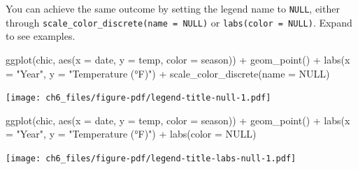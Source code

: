 \documentclass[
  letterpaper,
]{scrbook}
\newenvironment{Shaded}{\begin{snugshade}}{\end{snugshade}}
\newcommand{\AttributeTok}[1]{\textcolor[rgb]{0.40,0.45,0.13}{#1}}
\newcommand{\ConstantTok}[1]{\textcolor[rgb]{0.56,0.35,0.01}{#1}}
\newcommand{\FunctionTok}[1]{\textcolor[rgb]{0.28,0.35,0.67}{#1}}
\newcommand{\NormalTok}[1]{\textcolor[rgb]{0.00,0.23,0.31}{#1}}
\newcommand{\SpecialCharTok}[1]{\textcolor[rgb]{0.37,0.37,0.37}{#1}}
\newcommand{\StringTok}[1]{\textcolor[rgb]{0.13,0.47,0.30}{#1}}
\begin{document}
\begin{tcolorbox}[enhanced jigsaw, rightrule=.15mm, arc=.35mm, title=\textcolor{quarto-callout-tip-color}{\faLightbulb}\hspace{0.5em}{Other Ways to remove Legend Titles}, colback=white, toptitle=1mm, colbacktitle=quarto-callout-tip-color!10!white, breakable, left=2mm, opacityback=0, leftrule=.75mm, bottomrule=.15mm, bottomtitle=1mm, colframe=quarto-callout-tip-color-frame, coltitle=black, toprule=.15mm, opacitybacktitle=0.6, titlerule=0mm]

You can achieve the same outcome by setting the legend name to
\texttt{NULL}, either through
\texttt{scale\_color\_discrete(name\ =\ NULL)} or
\texttt{labs(color\ =\ NULL)}. Expand to see examples.

\begin{Shaded}
\begin{Highlighting}[]
\FunctionTok{ggplot}\NormalTok{(chic, }\FunctionTok{aes}\NormalTok{(}\AttributeTok{x =}\NormalTok{ date, }\AttributeTok{y =}\NormalTok{ temp, }\AttributeTok{color =}\NormalTok{ season)) }\SpecialCharTok{+}
  \FunctionTok{geom\_point}\NormalTok{() }\SpecialCharTok{+}
  \FunctionTok{labs}\NormalTok{(}\AttributeTok{x =} \StringTok{"Year"}\NormalTok{, }\AttributeTok{y =} \StringTok{"Temperature (°F)"}\NormalTok{) }\SpecialCharTok{+}
  \FunctionTok{scale\_color\_discrete}\NormalTok{(}\AttributeTok{name =} \ConstantTok{NULL}\NormalTok{)}
\end{Highlighting}
\end{Shaded}

\texttt{[image: ch6\_files/figure-pdf/legend-title-null-1.pdf]}

\begin{Shaded}
\begin{Highlighting}[]
\FunctionTok{ggplot}\NormalTok{(chic, }\FunctionTok{aes}\NormalTok{(}\AttributeTok{x =}\NormalTok{ date, }\AttributeTok{y =}\NormalTok{ temp, }\AttributeTok{color =}\NormalTok{ season)) }\SpecialCharTok{+}
  \FunctionTok{geom\_point}\NormalTok{() }\SpecialCharTok{+}
  \FunctionTok{labs}\NormalTok{(}\AttributeTok{x =} \StringTok{"Year"}\NormalTok{, }\AttributeTok{y =} \StringTok{"Temperature (°F)"}\NormalTok{) }\SpecialCharTok{+}
  \FunctionTok{labs}\NormalTok{(}\AttributeTok{color =} \ConstantTok{NULL}\NormalTok{)}
\end{Highlighting}
\end{Shaded}

\texttt{[image: ch6\_files/figure-pdf/legend-title-labs-null-1.pdf]}

\end{tcolorbox}
\end{document}
